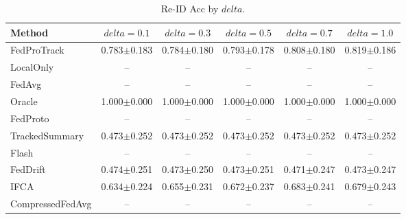 \begin{table}[t]
\centering
\caption{Re-ID Acc by $delta$.}
\label{tab:delta_concept_re_id_accuracy}
\begin{tabular}{lccccc}
\toprule
Method & $delta=0.1$ & $delta=0.3$ & $delta=0.5$ & $delta=0.7$ & $delta=1.0$ \\
\midrule
FedProTrack & 0.783$\pm$0.183 & 0.784$\pm$0.180 & 0.793$\pm$0.178 & 0.808$\pm$0.180 & 0.819$\pm$0.186 \\
LocalOnly & -- & -- & -- & -- & -- \\
FedAvg & -- & -- & -- & -- & -- \\
Oracle & 1.000$\pm$0.000 & 1.000$\pm$0.000 & 1.000$\pm$0.000 & 1.000$\pm$0.000 & 1.000$\pm$0.000 \\
FedProto & -- & -- & -- & -- & -- \\
TrackedSummary & 0.473$\pm$0.252 & 0.473$\pm$0.252 & 0.473$\pm$0.252 & 0.473$\pm$0.252 & 0.473$\pm$0.252 \\
Flash & -- & -- & -- & -- & -- \\
FedDrift & 0.474$\pm$0.251 & 0.473$\pm$0.250 & 0.473$\pm$0.251 & 0.471$\pm$0.247 & 0.473$\pm$0.247 \\
IFCA & 0.634$\pm$0.224 & 0.655$\pm$0.231 & 0.672$\pm$0.237 & 0.683$\pm$0.241 & 0.679$\pm$0.243 \\
CompressedFedAvg & -- & -- & -- & -- & -- \\
\bottomrule
\end{tabular}
\end{table}